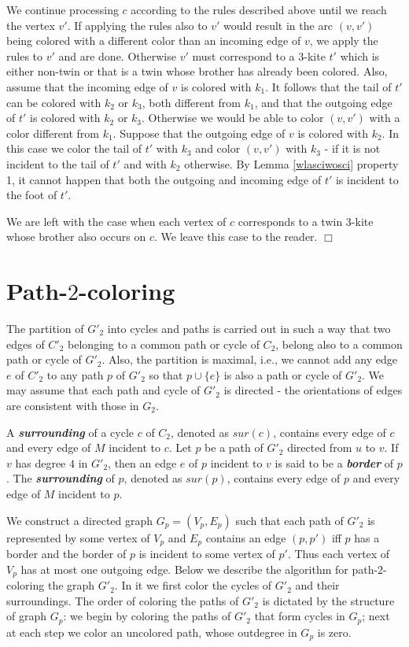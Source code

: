 \documentclass[a4, 11pt]{article}
\newcommand{\koniec}{\hfill $\Box$\\[.1ex]}
\newcommand{\<}{\langle}
\renewcommand{\>}{\rangle}
\begin{document}
We continue processing $c$ according to the rules described above until we reach the vertex $v'$. If applying the rules also to $v'$ would result in the arc $(v,v')$ being colored with a different color than an incoming edge of $v$, we apply the rules to $v'$ and are done. Otherwise $v'$ must correspond to a $3$-kite $t'$ which is either non-twin or that is a twin whose brother has already been colored. Also, assume  that the incoming edge of $v$ is colored with $k_1$. It follows  that the tail of $t'$ can be colored with $k_2$ or $k_3$, both different from $k_1$, and that the outgoing edge of $t'$ is colored with $k_2$ or $k_3$. Otherwise we would be able to color $(v,v')$ with a color different from $k_1$. Suppose that the outgoing edge of $v$ is colored with $k_2$. In this case we color the tail of $t'$ with $k_3$ and color $(v,v')$ with $k_3$ - if it is not incident to the tail of $t'$ and with $k_2$ otherwise. By Lemma \ref{wlasciwosci} property 1, it cannot happen that both the outgoing and incoming edge of $t'$ is incident to the foot of $t'$.

We are left with the case when each vertex of $c$ corresponds to a twin $3$-kite whose brother also occurs on $c$. We leave this case to the reader. \koniec


\section{Path-$2$-coloring} \label{path2}
The partition of $G'_2$ into cycles and paths is carried out in such a way that two edges of $C'_2$ belonging to a common path or cycle of $C_2$, belong also to a common path or cycle of $G'_2$. Also, the partition is maximal, i.e., we cannot
add any edge $e$ of $C'_2$ to any path $p$ of $G'_2$ so that $p \cup \{e\}$ is also a path or cycle of $G'_2$. We may assume that each path and cycle of $G'_2$ is directed - the orientations of edges are consistent with those in $G_2$. 



A {\bf \em surrounding} of a cycle $c$ of $C_2$, denoted as $sur(c)$, contains  every edge of $c$ and  every edge of $M$ incident to $c$.
Let $p$ be a path of $G'_2$ directed from $u$ to $v$. If $v$ has degree $4$ in $G'_2$, then an edge $e$ of $p$ incident to $v$ is said to be a {\bf \em border} of $p$.
The {\bf \em surrounding} of  $p$, denoted as $sur(p)$, contains  every edge of $p$  and every edge of $M$ incident to $p$.  

We construct a directed graph $G_p= (V_p, E_p)$ such that each path of $G'_2$ is represented by some vertex of $V_p$ and $E_p$ contains an edge $(p, p')$ iff $p$ has a border and the border of $p$ is incident to some vertex of $p'$.
Thus each vertex of $V_p$ has at most one outgoing edge. Below we describe the algorithm for path-$2$-coloring the graph $G'_2$. In it we first color the cycles of $G'_2$ and their surroundings.  The order of coloring the paths of $G'_2$
is dictated by the structure of graph $G_p$: we begin by coloring the paths of $G'_2$ that form cycles in $G_p$; next at each step we color an uncolored path, whose outdegree in $G_p$ is zero.
\end{document}
